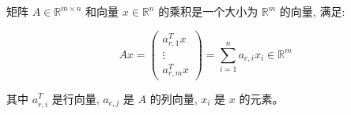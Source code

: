 \vspace{0.3cm}

\begin{definition}[矩阵与向量间的乘法运算] \label{def:mat-vec-multi}

矩阵 $A \in \mathbb{R}^{m \times n}$ 和向量 $x \in \mathbb{R}^n$ 的乘积是一个大小为 $\mathbb{R}^m$ 的向量, 满足:

$$
A x=\left(\begin{array}{c}
a_{r, 1}^T x \\
\vdots \\
a_{r, m}^T x
\end{array}\right)=\sum_{i=1}^n a_{c, i} x_i \in \mathbb{R}^m
$$

其中 $a_{r, i}^T$ 是行向量, $a_{c, j}$ 是 $A$ 的列向量, $x_i$ 是 $x$ 的元素。
\end{definition}

